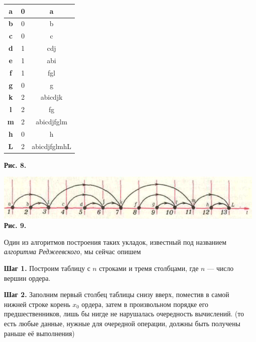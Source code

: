 \setlength{\columnsep}{1cm}

\begin{multicols*}{2}



\begin{center}
\begin{tabular}{|c|c|c|}
\hline
\textbf{a} & 0 & a \\ \hline
\textbf{b} & 0 & b \\ \hline
\textbf{c} & 0 & c \\ \hline
\textbf{d} & 1 & cdj \\ \hline
\textbf{e} & 1 & abi \\ \hline
\textbf{f} & 1 & fgl \\ \hline
\textbf{g} & 0 & g \\ \hline
\textbf{k} & 2 & abicdjk \\ \hline
\textbf{l} & 2 & fg \\ \hline
\textbf{m} & 2 & abicdjfglm \\ \hline
\textbf{h} & 0 & h \\ \hline
\textbf{L} & 2 & abicdjfglmhL \\ \hline
\end{tabular}
\end{center}
\begin{center}
    \textbf{Рис. 8.}
\end{center}


\begin{center}
\includegraphics[width=1\textwidth]{png9.png} \\
\textbf{Рис. 9.}
\end{center}

Один из алгоритмов построения таких укладок, известный под названием \textit{алгоритма Реджеевского}, мы сейчас опишем

\vspace{0.3cm}
\noindent\textbf{Шаг 1.} Построим таблицу с $n$ строками и тремя столбцами, где $n$ — число вершин ордера.

\vspace{0.3cm}
\noindent\textbf{Шаг 2.} Заполним первый столбец таблицы снизу вверх, поместив в самой нижней строке корень $x_0$ ордера, затем в произвольном порядке его предшественников, лишь бы нигде не нарушалась очередность вычислений. (то есть любые данные, нужные для очередной операции, должны быть получены раньше её выполнения)


\end{multicols*}
